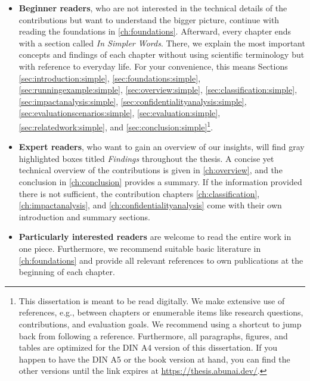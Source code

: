 \begin{itemize}
    \item[\faChevronCircleRight] \textbf{Beginner readers}, who are not interested in the technical details of the contributions but want to understand the bigger picture, continue with reading the foundations in \autoref{ch:foundations}.
    Afterward, every chapter ends with a section called \emph{In Simpler Words}.
    There, we explain the most important concepts and findings of each chapter without using scientific terminology but with reference to everyday life.
    For your convenience, this means Sections \ref{sec:introduction:simple}, \ref{sec:foundations:simple}, \ref{sec:runningexample:simple}, \ref{sec:overview:simple}, \ref{sec:classification:simple}, \ref{sec:impactanalysis:simple}, \ref{sec:confidentialityanalysis:simple}, \ref{sec:evaluationscenarios:simple}, \ref{sec:evaluation:simple}, \ref{sec:relatedwork:simple}, and \ref{sec:conclusion:simple}\footnote{%
    This dissertation is meant to be read digitally.
    We make extensive use of references, e.g., between chapters or enumerable items like research questions, contributions, and evaluation goals.
    We recommend using a shortcut to jump back from following a reference.
    Furthermore, all paragraphs, figures, and tables are optimized for the DIN A4 version of this dissertation.
    If you happen to have the DIN A5 or the book version at hand, you can find the other versions until the link expires at \url{https://thesis.abunai.dev/}.}.

    \item[\faChevronCircleRight] \textbf{Expert readers}, who want to gain an overview of our insights, will find gray highlighted boxes titled \emph{Findings} throughout the thesis.
    A concise yet technical overview of the contributions is given in \autoref{ch:overview}, and the conclusion in \autoref{ch:conclusion} provides a summary.
    If the information provided there is not sufficient, the contribution chapters \ref{ch:classification}, \ref{ch:impactanalysis}, and \ref{ch:confidentialityanalysis} come with their own introduction and summary sections.

    \item[\faChevronCircleRight] \textbf{Particularly interested readers} are welcome to read the entire work in one piece.
    Furthermore, we recommend suitable basic literature in \autoref{ch:foundations} and provide all relevant references to own publications at the beginning of each chapter.
\end{itemize}





